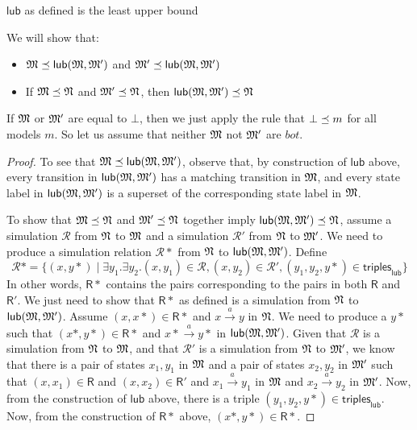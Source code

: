 

\begin{lemma}
$\mathsf{lub}$ as defined is the least upper bound
\end{lemma}
We will show that:
\begin{itemize}
\item
$\frak{M} \preceq \mathsf{lub}(\frak{M}, \frak{M}')$ and $\frak{M}' \preceq \mathsf{lub}(\frak{M}, \frak{M}')$
\item
If $\frak{M} \preceq \frak{N} $ and $\frak{M}' \preceq \frak{N} $, then $\mathsf{lub}(\frak{M}, \frak{M}') \preceq \frak{N}$
\end{itemize}
If $\frak{M}$ or $ \frak{M}'$ are equal to $\bot$, then we just apply the rule that $\bot \preceq m$ for all models $m$. 
So let us assume that neither $\frak{M}$ not $\frak{M}'$ are $bot$.

\begin{proof}
To see that $\frak{M} \preceq \mathsf{lub}(\frak{M}, \frak{M}')$, observe that, by construction of $\mathsf{lub}$ above, every transition in $\mathsf{lub}(\frak{M}, \frak{M}')$ has a matching transition in $\frak{M}$, and every state label in  $\mathsf{lub}(\frak{M}, \frak{M}')$ is a superset of the corresponding state label in $\frak{M}$.

To show that $\frak{M} \preceq \frak{N} $ and $\frak{M}' \preceq \frak{N} $ together imply $\mathsf{lub}(\frak{M}, \frak{M}') \preceq \frak{N}$, assume a simulation $\mathcal{R}$ from $\frak{N}$ to $\frak{M}$ and a simulation $\mathcal{R}'$ from $\frak{N}$ to $\frak{M}'$.
We need to produce a simulation relation $\mathcal{R}*$ from $\frak{N}$ to $\mathsf{lub}(\frak{M}, \frak{M}')$.
Define
\[
\mathcal{R}* =   \{(x, y*) \; | \; \exists y_1 . \exists y_2 . (x,y_1) \in \mathcal{R}, (x,y_2) \in \mathcal{R}', (y_1,y_2,y*) \in \mathsf{triples}_\mathsf{lub} \}
\]
In other words, $\mathsf{R}*$ contains the pairs corresponding to the pairs in both $\mathsf{R}$ and $\mathsf{R}'$.
We just need to show that $\mathsf{R}*$ as defined is a simulation from $\frak{N}$ to $\mathsf{lub}(\frak{M}, \frak{M}')$.
Assume $(x,x*) \in \mathsf{R}*$ and $x \xrightarrow{a} y$ in $\frak{N}$. 
We need to produce a $y*$ such that $(x*,y*) \in \mathsf{R}*$ and $x* \xrightarrow{a} y*$ in $\mathsf{lub}(\frak{M}, \frak{M}')$.
Given that $\mathcal{R}$ is a simulation from $\frak{N}$ to $\frak{M}$, and that  $\mathcal{R}'$ is a simulation from $\frak{N}$ to $\frak{M}'$, we know that there is a pair of states $x_1, y_1$ in $\frak{M}$ and a pair of states $x_2, y_2$ in $\frak{M}'$ such that $(x,x_1) \in \mathsf{R}$ and $(x,x_2) \in \mathsf{R}'$ and $x_1 \xrightarrow{a} y_1$ in $\frak{M}$ and $x_2 \xrightarrow{a} y_2$ in $\frak{M}'$.
Now, from the construction of $\mathsf{lub}$ above, there is a triple $(y_1, y_2, y*) \in \mathsf{triples}_\mathsf{lub}$.
Now, from the construction of $\mathsf{R}*$ above, $(x*,y*) \in \mathsf{R}*$.


\end{proof}
